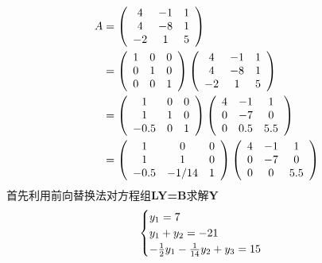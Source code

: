 \documentclass[UTF8]{ctexart}
\begin{document}
\begin{equation}
	\begin{aligned}
	A &=
	\left(
		\begin{array}{ccc}
			4 & -1 & 1\\
			4 & -8 & 1\\
			-2 & 1 & 5 
		\end{array}
	\right)\\
	& =
	\left(
		\begin{array}{ccc}
			1 & 0 & 0\\
			0 & 1 & 0\\
			0 & 0 & 1 
		\end{array}
	\right)
	\left(
		\begin{array}{ccc}
			4 & -1 & 1\\
			4 & -8 & 1\\
			-2 & 1 & 5 
		\end{array}
	\right)\\
	& =
	\left(
		\begin{array}{ccc}
			1 & 0 & 0\\
			1 & 1 & 0\\
			-0.5 & 0 & 1 
		\end{array}
	\right)
	\left(
		\begin{array}{ccc}
			4 & -1 & 1\\
			0 & -7 & 0\\
			0 & 0.5 & 5.5 
		\end{array}
	\right)\\
	& =
	\left(
		\begin{array}{ccc}
			1 & 0 & 0\\
			1 & 1 & 0\\
			-0.5 & -1/14 & 1 
		\end{array}
	\right)
	\left(
		\begin{array}{ccc}
			4 & -1 & 1\\
			0 & -7 & 0\\
			0 & 0 & 5.5 
		\end{array}
	\right) \notag
	\end{aligned}
\end{equation}
首先利用前向替换法对方程组\textbf{LY=B}求解\textbf{Y}
\begin{equation}
	\begin{cases}
		y_1 = 7 \\
		y_1 + y_2 = -21 \\
		-\frac{1}{2}y_1 - \frac{1}{14}y_2 + y_3 = 15 \notag
	\end{cases}
\end{equation}
\end{document}
